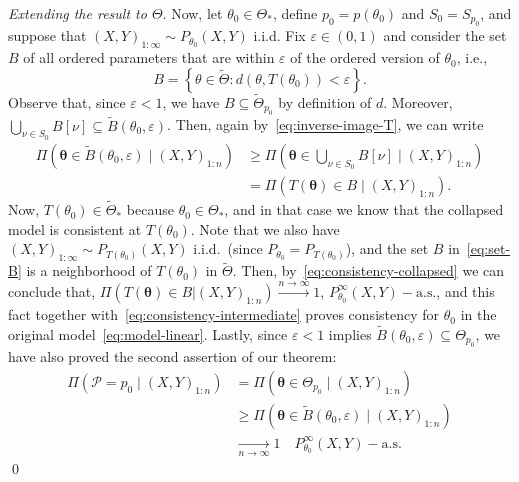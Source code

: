 \documentclass{article}
\numberwithin{equation}{section}
\theoremstyle{plain}
\renewcommand{\epsilon}{\varepsilon}
\newcommand{\tTheta}{\tilde{\Theta}}
\begin{document}
\textit{Extending the result to \(\Theta\)}. Now, let \(\theta_0\in\Theta_*\), define \(p_0=p(\theta_0)\) and \(S_0 = S_{p_0}\), and suppose that \((X,Y)_{1:\infty}\sim P_{\theta_0}(X, Y)\) i.i.d. Fix \(\epsilon\in(0,1)\) and consider the set \(B\) of all ordered parameters that are within \(\epsilon\) of the ordered version of \(\theta_0\), i.e.,
\begin{equation}\label{eq:set-B}
  B = \left\{ \theta \in \tTheta: d(\theta, T(\theta_0)) < \epsilon \right\}.
\end{equation}
Observe that, since \(\epsilon < 1\), we have \(B\subseteq \tTheta_{p_0}\) by definition of \(d\). Moreover, \(\bigcup_{\nu\in S_{0}}B[\nu]\subseteq \tilde{B}(\theta_0, \epsilon)\). Then, again by~\eqref{eq:inverse-image-T}, we can write
\begin{equation}\label{eq:consistency-intermediate}
  \begin{aligned}
    \Pi(\bm\theta \in \tilde{B}(\theta_0, \epsilon) \mid (X,Y)_{1:n}) & \geq \Pi(\bm\theta \in \bigcup_{\nu\in S_{0}} B[\nu] \mid (X,Y)_{1:n}) \\
                                                                      & = \Pi(T(\bm\theta) \in B \mid (X,Y)_{1:n}).
  \end{aligned}
\end{equation}
Now, \(T(\theta_0)\in{\tTheta_*}\) because \(\theta_0\in\Theta_*\), and in that case we know that the collapsed model is consistent at \(T(\theta_0)\). Note that we also have \((X,Y)_{1:\infty} \sim P_{T(\theta_0)}(X, Y)\) i.i.d.\ (since \(P_{\theta_0}=P_{T(\theta_0)}\)), and the set \(B\) in~\eqref{eq:set-B} is a neighborhood of \(T(\theta_0)\) in \(\tTheta\). Then, by~\eqref{eq:consistency-collapsed} we can conclude that, \(\Pi(T(\bm\theta) \in B | (X,Y)_{1:n}) \xrightarrow[]{n\to\infty} 1\), \(P_{\theta_0}^\infty (X,Y)-\text{a.s.}\), and this fact together with~\eqref{eq:consistency-intermediate} proves consistency for \(\theta_0\) in the original model~\eqref{eq:model-linear}. Lastly, since \(\epsilon < 1\) implies \(\tilde{B}(\theta_0,\epsilon) \subseteq \Theta_{p_0}\), we have also proved the second assertion of our theorem:
\begin{align*}
  \Pi(\mathcal P=p_0\mid (X,Y)_{1:n}) & = \Pi(\bm\theta \in \Theta_{p_0}\mid (X, Y)_{1:n})                       \\
                                      & \geq \Pi(\bm\theta \in\tilde{B}(\theta_0,\epsilon) \mid (X,Y)_{1:n})     \\
                                      & \xrightarrow[n\to\infty]{} 1 \quad P_{\theta_0}^\infty (X,Y)-\text{a.s.}
\end{align*}\qed{}
\end{document}
